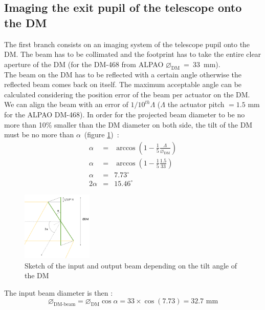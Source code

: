 \documentclass[12pt,a4paper]{article}
\begin{document}
\subsection{Imaging the exit pupil of the telescope onto the DM}
The first branch consists on an imaging system of the telescope pupil onto the DM. The beam has to be collimated and the footprint has to take the entire clear aperture of the DM (for the DM-468 from ALPAO $\diameter_{\text{DM}}$~=~33~mm).\\
The beam on the DM has to be reflected with a certain angle otherwise the reflected beam comes back on itself. The maximum acceptable angle can be calculated considering the position error of the beam per actuator on the DM. We can align the beam with an error of $1/10^{th} \Lambda$ ($\Lambda$ the actuator pitch $= 1.5$ mm for the ALPAO DM-468). In order for the projected beam diameter to be no more than 10\% smaller than the DM diameter on both side, the tilt of the DM must be no more than $\alpha$~(figure \ref{fig:OAP0_DM_diam_beam_diam})~:
\begin{eqnarray}
	\alpha &= &\arccos\left(1-\frac{1}{5}\frac{\Lambda}{\diameter_{\text{DM}}}\right)\nonumber\\
	\alpha &= &\arccos\left(1-\frac{1}{5}\frac{1.5}{33}\right)\nonumber\\
	\alpha &= &7.73^{ \circ}\label{eq:alphaDM}\\
	2\alpha &= &15.46^{ \circ}\nonumber
\end{eqnarray}

\begin{figure}[H]
	\begin{center}
		\includegraphics[width=0.3\textwidth]{images/OAP0_DM_diam_beam_diam.PNG}
		\caption{Sketch of the input and output beam depending on the tilt angle of the DM}\label{fig:OAP0_DM_diam_beam_diam}
	\end{center}
\end{figure}
The input beam diameter is then :
\begin{equation}
	\diameter_{\text{DM-beam}} = \diameter_{\text{DM}} \cos{\alpha} = 33\times \cos{(7.73)} = 32.7 \text{ mm}
\end{equation}
\end{document}
